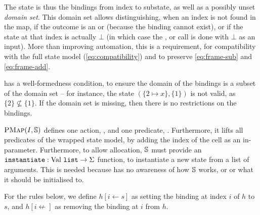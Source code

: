 The state is thus the bindings from index to substate, as well as a possibly unset \emph{domain set}. This domain set allows distinguishing, when an index is not found in the map, if the outcome is an \Err{} or \LFail{} (because the binding cannot exist), or if the state at that index is actually $\bot$ (in which case the \execac, \consume{} or \produce{} call is done with $\bot$ as an input). More than improving automation, this is a requirement, for compatibility with the full state model (\ref{eq:compatibility}) and to preserve \ref{eq:frame-sub} and \ref{eq:frame-add}.

\PMap{} has a well-formedness condition, to ensure the domain of the bindings is a subset of the domain set -- for instance, the state $(\{ 2 \mapsto x \}, \{ 1 \})$ is not valid, as $\{2\} \not\subseteq \{1\}$. If the domain set is missing, then there is no restrictions on the bindings.

$\textsc{PMap}(I,\mathbb S)$ defines one action, \alloc, and one predicate, \domainset. Furthermore, it lifts all predicates of the wrapped state model, by adding the index of the cell as an in-parameter. Furthermore, to allow allocation, $\mathbb S$ must provide an ${\texttt{instantiate}: \text{Val}~\texttt{list} \rightarrow \Sigma}$ function, to instantiate a new state from a list of arguments. This is needed because \PMap{} has no awareness of how $\mathbb S$ works, or or what it should be initialised to. 

For the rules below, we define $h[i \leftarrow s]$ as setting the binding at index $i$ of $h$ to $s$, and $h[i \not\leftarrow]$ as removing the binding at $i$ from $h$.

